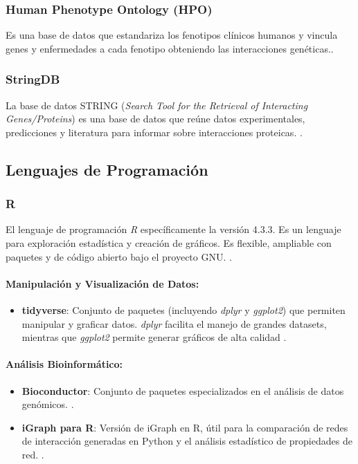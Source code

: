 \subsubsection{Human Phenotype Ontology (HPO)}
  Es una base de datos que estandariza los fenotipos clínicos humanos y vincula genes y enfermedades a cada fenotipo obteniendo las interacciones genéticas.\cite{gargano2024}. 
\subsubsection{StringDB}
La base de datos STRING (\textit{Search Tool for the Retrieval of Interacting Genes/Proteins}) es una base de datos que reúne datos experimentales, predicciones y literatura para informar sobre interacciones proteicas. \cite{szklarczyk2019}.

\subsection{Lenguajes de Programación}

\subsubsection{R}
El lenguaje de programación \textit{R} específicamente la versión 4.3.3. Es un lenguaje para exploración estadística y creación de gráficos. Es flexible, ampliable con paquetes y de código abierto bajo el proyecto GNU. \cite{chan2018}.


\paragraph{Manipulación y Visualización de Datos:}
\begin{itemize}
	\item \textbf{tidyverse}: Conjunto de paquetes (incluyendo \textit{dplyr} y \textit{ggplot2}) que permiten manipular y graficar datos. \textit{dplyr} facilita el manejo de grandes datasets, mientras que \textit{ggplot2} permite generar gráficos de alta calidad \cite{Wickham2019}.
\end{itemize}

\paragraph{Análisis Bioinformático:}
\begin{itemize}
	\item \textbf{Bioconductor}: Conjunto de paquetes especializados en el análisis de datos genómicos. \cite{Huber2015}.
	\item \textbf{iGraph para R}: Versión de iGraph en R, útil para la comparación de redes de interacción generadas en Python y el análisis estadístico de propiedades de red. \cite{Csardi2006}.
\end{itemize}


